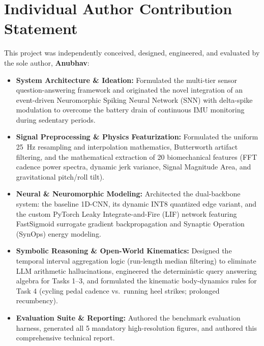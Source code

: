 \documentclass[11pt,a4paper]{article}
\begin{document}
\section{Individual Author Contribution Statement}
This project was independently conceived, designed, engineered, and evaluated by the sole author, \textbf{Anubhav}:
\begin{itemize}
    \item \textbf{System Architecture \& Ideation:} Formulated the multi-tier sensor question-answering framework and originated the novel integration of an event-driven Neuromorphic Spiking Neural Network (SNN) with delta-spike modulation to overcome the battery drain of continuous IMU monitoring during sedentary periods.
    \item \textbf{Signal Preprocessing \& Physics Featurization:} Formulated the uniform 25~Hz resampling and interpolation mathematics, Butterworth artifact filtering, and the mathematical extraction of 20 biomechanical features (FFT cadence power spectra, dynamic jerk variance, Signal Magnitude Area, and gravitational pitch/roll tilt).
    \item \textbf{Neural \& Neuromorphic Modeling:} Architected the dual-backbone system: the baseline 1D-CNN, its dynamic INT8 quantized edge variant, and the custom PyTorch Leaky Integrate-and-Fire (LIF) network featuring FastSigmoid surrogate gradient backpropagation and Synaptic Operation (SynOps) energy modeling.
    \item \textbf{Symbolic Reasoning \& Open-World Kinematics:} Designed the temporal interval aggregation logic (run-length median filtering) to eliminate LLM arithmetic hallucinations, engineered the deterministic query answering algebra for Tasks 1--3, and formulated the kinematic body-dynamics rules for Task 4 (cycling pedal cadence vs.\ running heel strikes; prolonged recumbency).
    \item \textbf{Evaluation Suite \& Reporting:} Authored the benchmark evaluation harness, generated all 5 mandatory high-resolution figures, and authored this comprehensive technical report.
\end{itemize}
\end{document}
